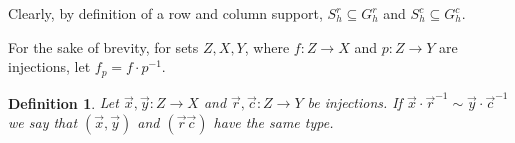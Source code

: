 \documentclass[12pt]{report}
\newtheorem{remark}[thm]{Remark} \newtheorem{definition}[thm]{Definition}
\newcommand{\stab}{\text{\textbf{Stab}}}
\newcommand{\sym}{\text{\textbf{Sym}}}
\newcommand{\orb}{\text{\textbf{Orb}}}
\newcommand{\consp}{\text{sp}}
\newcommand{\type}{\text{type}}
\newcommand{\spstab}[1]{\stab (\consp (#1))}
\begin{document}
Clearly, by definition of a row and column support, $S^r_h \subseteq G^r_h$ and
$S^c_h \subseteq G^c_h$.






For the sake of brevity, for sets $Z,X,Y$, where $f : Z \rightarrow X$ and $p :
Z \rightarrow Y$ are injections, let $f_p = f \cdot p^{-1}$.

\begin{definition}
  Let $\vec{x}, \vec{y} : Z \rightarrow X$ and $\vec{r}, \vec{c}: Z \rightarrow
  Y$ be injections. If $\vec{x} \cdot \vec{r}^{-1} \sim \vec{y} \cdot
  \vec{c}^{-1}$ we say that $(\vec{x}, \vec{y})$ and $(\vec{r} \vec{c})$ have
  the same \emph{type}.
\end{definition}
\end{document}
